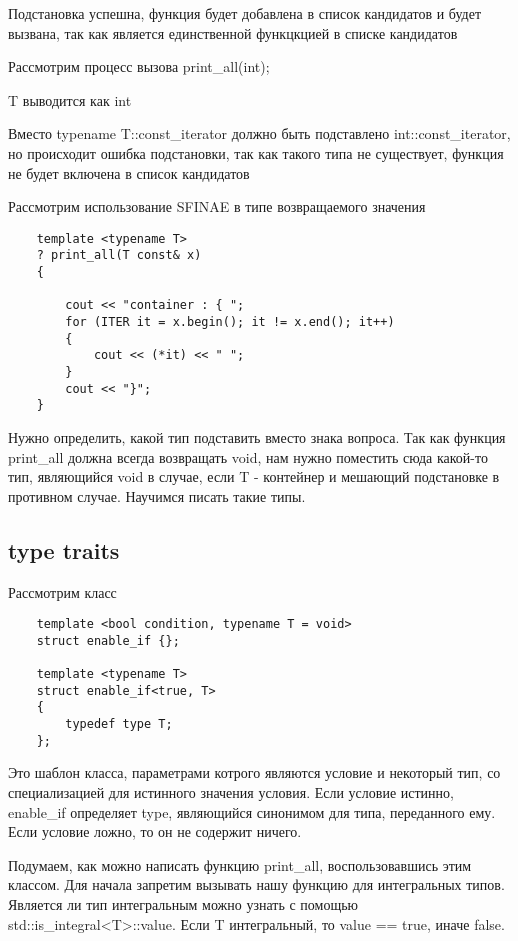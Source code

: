 	Подстановка успешна, функция будет добавлена в список кандидатов и будет вызвана, так как является единственной функцкцией в списке кандидатов
	
	
	Рассмотрим процесс вызова print\_all(int);
		
	T выводится как int
		
	Вместо typename T::const\_iterator должно быть подставлено int::const\_iterator, но происходит ошибка подстановки, так как такого типа не существует, функция не будет включена в список кандидатов
	
	Рассмотрим использование SFINAE в типе возвращаемого значения
	
	\begin{verbatim}
	template <typename T>
	? print_all(T const& x)
	{

	    cout << "container : { ";
	    for (ITER it = x.begin(); it != x.end(); it++)
	    {
	        cout << (*it) << " ";
	    } 
	    cout << "}";
	}
	\end{verbatim}
	
	Нужно определить, какой тип подставить вместо знака вопроса. Так как функция print\_all должна всегда возвращать void, нам нужно поместить сюда какой-то тип, являющийся void в случае, если T - контейнер и мешающий подстановке в противном случае. Научимся писать такие типы.
	
	\subsection{type traits}
	
	Рассмотрим класс
	
	\begin{verbatim}
	template <bool condition, typename T = void>
	struct enable_if {};
 
	template <typename T>
	struct enable_if<true, T>
	{
	    typedef type T;
	};
	\end{verbatim}
	
	Это шаблон класса, параметрами котрого являются условие и некоторый тип, со специализацией для истинного значения условия. Если условие истинно, enable\_if определяет type, являющийся синонимом для типа, переданного ему. Если условие ложно, то он не содержит ничего. 
	
	Подумаем, как можно написать функцию print\_all, воспользовавшись этим классом. Для начала запретим вызывать нашу функцию для интегральных типов. Является ли тип интегральным можно узнать с помощью std::is\_integral<T>::value. Если T интегральный, то value == true, иначе false.


